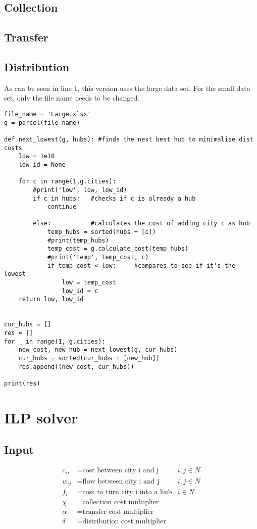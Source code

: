 \documentclass{article}
\begin{document}
\subsection{Collection}
\subsection{Transfer}
\subsection{Distribution}
As can be seen in line 1, this version uses the large data set. For the small data set, only the file name needs to be changed.
\begin{verbatim}
file_name = 'Large.xlsx'
g = parcel(file_name)

def next_lowest(g, hubs): #finds the next best hub to minimalise dist costs
    low = 1e10
    low_id = None
    
    for c in range(1,g.cities):
        #print('low', low, low_id)
        if c in hubs:   #checks if c is already a hub
            continue
        
        else:           #calculates the cost of adding city c as hub
            temp_hubs = sorted(hubs + [c])
            #print(temp_hubs)
            temp_cost = g.calculate_cost(temp_hubs)
            #print('temp', temp_cost, c)
            if temp_cost < low:     #compares to see if it's the lowest
                low = temp_cost
                low_id = c
    return low, low_id


cur_hubs = []
res = []
for _ in range(1, g.cities):
    new_cost, new_hub = next_lowest(g, cur_hubs)
    cur_hubs = sorted(cur_hubs + [new_hub])
    res.append((new_cost, cur_hubs))

print(res)
\end{verbatim}
\newpage

\section{ILP solver}
\label{ILPDef}
\subsection*{Input}
\begin{align*}
c_{ij} &= \text{cost between city i and j}  &i,j \in N\\
w_{ij} &= \text{flow between city i and j} &i,j \in N\\
f_{i} &= \text{cost to turn city i into a hub} &i \in N\\
\chi &= \text{collection cost multiplier} \\
\alpha &= \text{transfer cost multiplier} \\
\delta &= \text{distribution cost multiplier} \\
\end{align*}
\end{document}

